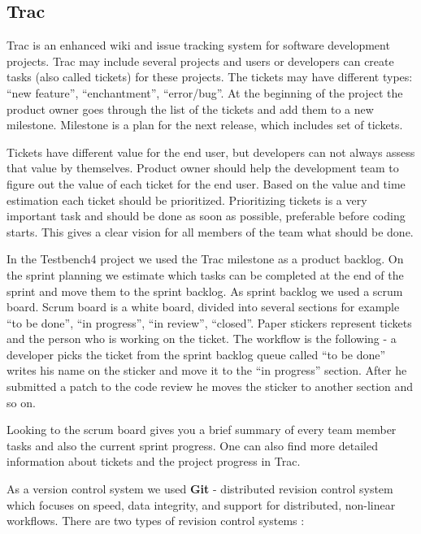   \subsection{Trac}
  Trac is an enhanced wiki and issue tracking system for software development
  projects. Trac may include several projects and users or developers can
  create tasks (also called tickets) for these projects. The tickets may have different types:
  ``new feature'', ``enchantment'', ``error/bug''. At the beginning of the project the product owner
  goes through the list of the tickets and add them to a new milestone.
  Milestone is a plan for the next release, which includes set of tickets.

  Tickets have different value for the end user, but developers can not always
  assess that value by themselves. Product owner should help the development team to figure out the
  value of each ticket for the end user. Based on the value and time estimation each ticket should be prioritized.
  Prioritizing tickets is a very important task and should be done as soon as
  possible, preferable before coding starts. This gives a clear vision for all
  members of the team what should be done.

  In the Testbench4 project we used the Trac milestone as a product backlog. On
  the sprint planning we estimate which tasks can be completed at the end of the sprint 
  and move them to the sprint backlog. As sprint backlog we used a scrum board.
  Scrum board is a white board, divided into several sections for example ``to be done'', ``in progress'', ``in review'',
  ``closed''. Paper stickers represent tickets and the person who is working on
  the ticket. The workflow is the following - a developer picks the
  ticket from the sprint backlog queue called ``to be done'' 
  writes his name on the sticker and move it to the ``in progress'' section.
  After he submitted a patch to the code review he moves the sticker to another
  section and so on.
  
  Looking to the scrum board gives you a brief summary of every team member tasks and 
  also the current sprint progress. One can also find more detailed information
  about tickets and the project progress in Trac.
 
  
  As a version control system we used \textbf{Git} - distributed revision control system
  which focuses on speed, data integrity, and support for distributed,
  non-linear workflows. There are two types of revision control systems :
  

